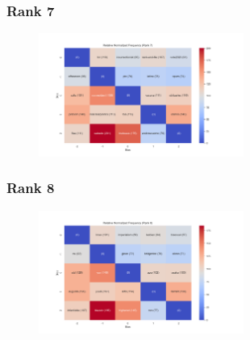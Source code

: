 \documentclass[11pt]{article}
\begin{document}
\subsubsection{Rank 7}
\begin{center}


\resizebox{\columnwidth}{!}
{
\TTRNFTable
}
\begin{figure}[h!]
  \includegraphics[width=0.6\textwidth]{figs/top_ten_rnf/rnf_t_rank_7.png}
\end{figure}
\end{center}

\pagebreak

\subsubsection{Rank 8}
\begin{center}


\resizebox{\columnwidth}{!}
{
\TTRNFTable
}
\begin{figure}[h!]
  \includegraphics[width=0.6\textwidth]{figs/top_ten_rnf/rnf_t_rank_8.png}
\end{figure}
\end{center}
\end{document}
